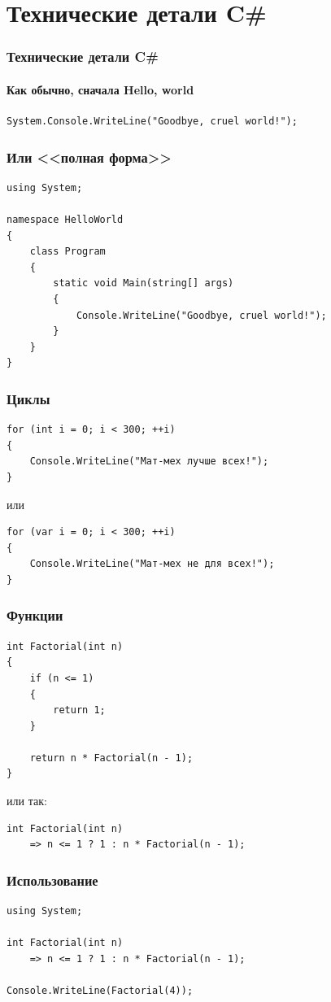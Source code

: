 \documentclass{../../slides-style}
\begin{document}
    \section{Технические детали C\#}

    \begin{frame}[fragile]
        \frametitle{Технические детали C\#}
        \framesubtitle{Как обычно, сначала Hello, world}
        \begin{verbatim}
System.Console.WriteLine("Goodbye, cruel world!");
        \end{verbatim}
    \end{frame}

    \begin{frame}[fragile]
        \frametitle{Или <<полная форма>>}
        \begin{verbatim}
using System;

namespace HelloWorld
{
    class Program
    {
        static void Main(string[] args)
        {
            Console.WriteLine("Goodbye, cruel world!");
        }
    }
}
        \end{verbatim}
    \end{frame}

    \begin{frame}[fragile]
        \frametitle{Циклы}
        \begin{verbatim}
for (int i = 0; i < 300; ++i)
{
    Console.WriteLine("Мат-мех лучше всех!");
}
        \end{verbatim}
        или
        \begin{verbatim}
for (var i = 0; i < 300; ++i)
{
    Console.WriteLine("Мат-мех не для всех!");
}
        \end{verbatim}
    \end{frame}

    \begin{frame}[fragile]
        \frametitle{Функции}
        \begin{verbatim}
int Factorial(int n)
{
    if (n <= 1)
    {
        return 1;
    }

    return n * Factorial(n - 1);
}
        \end{verbatim}
        или так:
        \begin{verbatim}
int Factorial(int n) 
    => n <= 1 ? 1 : n * Factorial(n - 1);
        \end{verbatim}
    \end{frame}

    \begin{frame}[fragile]
        \frametitle{Использование}
        \begin{verbatim}
using System;

int Factorial(int n) 
    => n <= 1 ? 1 : n * Factorial(n - 1);

Console.WriteLine(Factorial(4));

        \end{verbatim}
    \end{frame}
\end{document}
